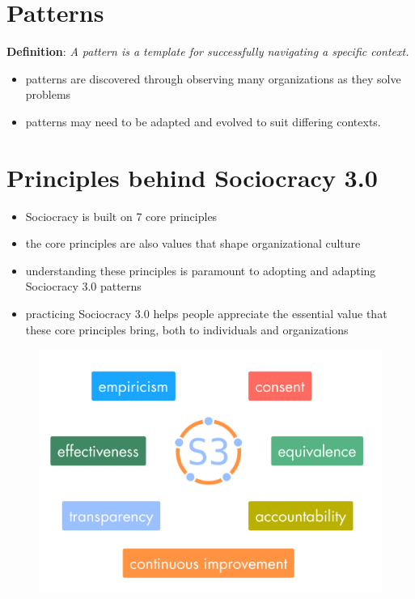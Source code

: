 \chapter{Patterns}
\label{patterns}

\textbf{Definition}: \emph{A pattern is a template for successfully navigating a specific context.}

\begin{itemize}
\item patterns are discovered through observing many organizations as they solve problems

\item patterns may need to be adapted and evolved to suit differing contexts.

\end{itemize}

\chapter{Principles behind Sociocracy 3.0}
\label{principlesbehindsociocracy3.0}

\begin{itemize}
\item Sociocracy is built on 7 core principles

\item the core principles are also values that shape organizational culture

\item understanding these principles is paramount to adopting and adapting Sociocracy 3.0 patterns

\item practicing Sociocracy 3.0 helps people appreciate the essential value that these core principles bring, both to individuals and organizations

\end{itemize}

\begin{figure}[htbp]
\centering
\includegraphics[keepaspectratio,width=\textwidth,height=0.75\textheight]{img/general/s3-principles-plain.png}
\end{figure}

